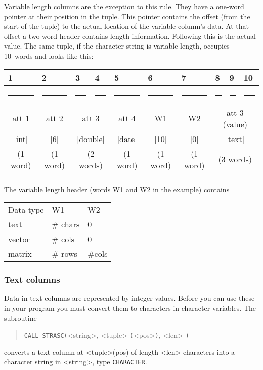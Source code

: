 \documentclass[11pt,a4paper]{report}
\def\I{\index}
\begin{document}
\medskip
Variable length columns are the exception to this rule.
They have a one-word pointer at their position in the tuple.
This pointer contains the offset (from the start of the tuple)
to the actual location of the variable column's data.
At that offset a two word header contains length information.
Following this is the actual value.
The same tuple, if the character string is variable length,
occupies 10~words and
looks like this:
 
\smallskip
{\centering\small{}
 \def\strut{\rule{0pt}{2pt}} \def\Strut{\rule{0pt}{12pt}}
 \def\fl{\multicolumn{1}{|l|}}
\begin{tabular}{|c|c|c|c|c|c|c|c|c|c|}
 \fl{1}&\fl{2}&\fl{3}&\fl{4}&\fl{5}&\fl{6}&\fl{7}&\fl{8}&\fl{9}&\fl{10}\\
 \hline
   \rule{25pt}{0pt}&
   \rule{25pt}{0pt}&
   \rule{25pt}{0pt}&
   \rule{25pt}{0pt}&
   \rule{25pt}{0pt}&
   \rule{25pt}{0pt}&
   \rule{25pt}{0pt}&
   \rule{25pt}{0pt}&
   \rule{25pt}{0pt}&
   \rule{25pt}{0pt}\\
 \Strut att 1&
 att 2&
 \multicolumn{2}{|c|}{att 3}&
 att 4&
  W1 &
  W2 &
  \multicolumn{3}{|c|}{att 3 (value)}\\
 \Strut [int]&
 [6]&
 \multicolumn{2}{|c|}{[double]}&
 [date]&
   [10]&
   [0]&
   \multicolumn{3}{|c|}{[text]}\\
 \Strut (1 word)&
 (1 word)&
 \multicolumn{2}{|c|}{(2 words)}&
 (1 word)&
  (1 word)&
  (1 word)&
  \multicolumn{3}{|c|}{(3 words)}\\
  &&&&&&&&&\\
 \hline
\end{tabular}
\par}
 
\medskip
The variable length header (words W1 and W2 in the example) contains
 
{\centering
\begin{tabular}{lll}
Data type& W1& W2\\
\noalign{\medskip}
text& \# chars& 0\\
vector&\# cols& 0\\
matrix& \# rows& \#cols
\end{tabular}}
 
 
\medskip
 
\subsubsection{Text columns}
%
\I{text}
Data in text columns are represented by integer values.
Before you can use these in your program you must convert them
to characters in character variables.
The subroutine
\I{strasc@"STRASC"}
\begin{verse}
  \verb!CALL STRASC(!<string>, <tuple> \verb!(!<pos>\verb!)!, <len> \verb!)!
\end{verse}
converts a text column at <tuple>(pos) of length <len> characters
into a character string in <string>, type \verb!CHARACTER!.
 
\end{document}

